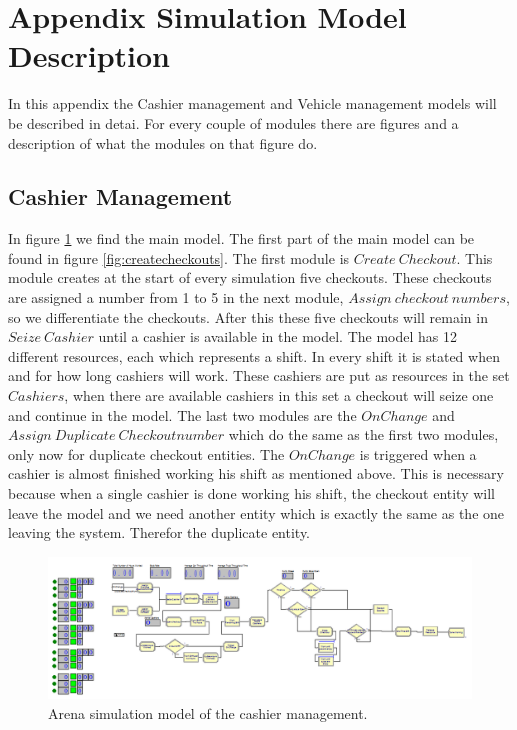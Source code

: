 \section{Appendix Simulation Model Description}\label{app:modeldescription}
In this appendix the Cashier management and Vehicle management models will be described in detai. For every couple of modules there are figures and a description of what the modules on that figure do.

\subsection{Cashier Management}\label{app:cashierdescription}
In figure \ref{fig:model-cashier} we find the main model. The first part of the main model can be found in figure \ref{fig:createcheckouts}. 
The first module is $Create \ Checkout$. This module creates at the start of every simulation five checkouts. 
These checkouts are assigned a number from 1 to 5 in the next module, $Assign \ checkout \ numbers$, so we differentiate the checkouts. 
After this these five checkouts will remain in $Seize \ Cashier$ until a cashier is available in the model. 
The model has 12 different resources, each which represents a shift. In every shift it is stated when and for how long cashiers will work. 
These cashiers are put as resources in the set $Cashiers$, when there are available cashiers in this set a checkout will seize one and continue in the model. 
The last two modules are the $OnChange$ and $Assign \ Duplicate \ Checkoutnumber$ which do the same as the first two modules, only now for duplicate checkout entities. 
The $OnChange$ is triggered when a cashier is almost finished working his shift as mentioned above. 
This is necessary because when a single cashier is done working his shift, the checkout entity will leave the model and we need another entity which is exactly the same as the one leaving the system. 
Therefor the duplicate entity.

\begin{figure}[!ht]
\begin{center}
	\includegraphics[scale=0.6]{images/model-description/main}
	\caption{Arena simulation model of the cashier management.}
	\label{fig:model-cashier}
\end{center}
\end{figure}

